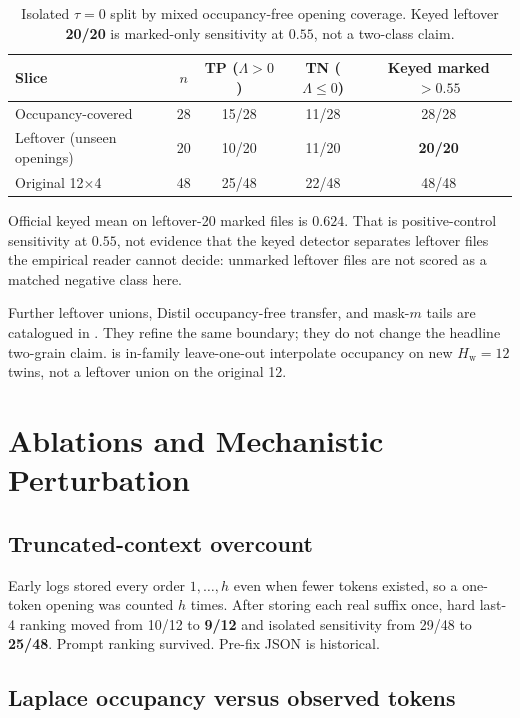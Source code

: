 \documentclass[11pt,a4paper]{article}
\theoremstyle{definition}
\newcommand{\LLR}{\Lambda}
\newcommand{\Hw}{H_{\mathrm{w}}}
\newcommand{\hist}{h}
\begin{document}
\begin{table}[t]
\centering
\small
\caption{Isolated $\tau=0$ split by mixed occupancy-free opening
coverage. Keyed leftover \textbf{20/20} is marked-only sensitivity at
$0.55$, not a two-class claim.}
\label{tab:split}
\begin{tabular}{l c c c c}
\toprule
Slice & $n$ & TP ($\LLR>0$) & TN ($\LLR\le 0$) & Keyed marked $>0.55$ \\
\midrule
Occupancy-covered & 28 & 15/28 & 11/28 & 28/28 \\
Leftover (unseen openings) & 20 & 10/20 & 11/20 & \textbf{20/20} \\
\midrule
Original 12$\times$4 & 48 & 25/48 & 22/48 & 48/48 \\
\bottomrule
\end{tabular}
\end{table}

Official keyed mean on leftover-20 marked files is $0.624$. That is
positive-control sensitivity at $0.55$, not evidence that the keyed
detector separates leftover files the empirical reader cannot decide:
unmarked leftover files are not scored as a matched negative class here.

Further leftover unions, Distil occupancy-free transfer, and mask-$m$
tails are catalogued in . They refine the same
boundary; they do not change the headline two-grain claim.
 is in-family leave-one-out interpolate occupancy on new
$\Hw=12$ twins, not a leftover union on the original 12.

\section{Ablations and Mechanistic Perturbation}
\label{sec:ablations}

\subsection{Truncated-context overcount}
\label{sec:overcount}

Early logs stored every order $1,\ldots,\hist$ even when fewer tokens existed,
so a one-token opening was counted $\hist$ times. After storing each
real suffix once, hard last-4 ranking moved from 10/12 to \textbf{9/12}
and isolated sensitivity from 29/48 to \textbf{25/48}. Prompt ranking
survived. Pre-fix JSON is historical.

\subsection{Laplace occupancy versus observed tokens}
\end{document}
